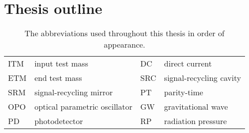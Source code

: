 

\section{Thesis outline}
\label{sec:thesis_outline}

\begin{table}
\centering
\begin{tabular}{@{}ll|ll@{}}
\toprule
ITM & input test mass & DC & direct current \\
ETM & end test mass & SRC & signal-recycling cavity \\
SRM & signal-recycling mirror & PT & parity-time \\
OPO & optical parametric oscillator & GW & gravitational wave \\
PD & photodetector & RP & radiation pressure \\ \bottomrule
\end{tabular}
\caption{The abbreviations used throughout this thesis in order of appearance.}
\label{tab:abbreviations}
\end{table}

